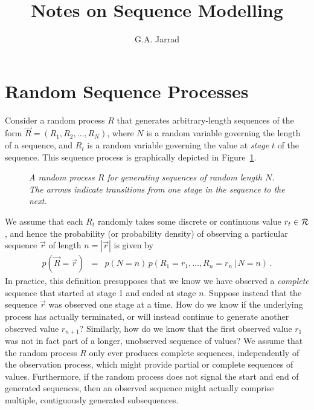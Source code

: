 \documentclass[a4paper]{article}
\title{Notes on Sequence Modelling}
\author{G.A. Jarrad}
\newcommand{\vr}{\vec{r}}
\begin{document}
\maketitle
{}
\section{Random Sequence Processes}
\label{sec:random-processes}
Consider a random process $R$ that generates arbitrary-length sequences
of the form $\vec{R}=(R_1,R_2,\ldots,R_N)$, where $N$ is a random variable governing
the length of a sequence, and $R_t$ is a random variable governing the value at {\em stage} $t$
of the sequence. This sequence process is graphically depicted in Figure~\ref{fig:R-process}.
\begin{figure}[hbt]
\centering
{}
\caption{\em A random process $R$ for generating sequences of random length $N$. The arrows indicate transitions from one stage in the sequence to the next.}
\label{fig:R-process}
\end{figure}

We assume that each $R_t$ randomly takes some discrete or continuous value $r_t\in{\cal R}$,
and hence the probability (or probability density) of observing a particular
sequence $\vr$ of length $n=|\vr|$ is given by
\begin{eqnarray}
   p(\vec{R}\!=\!\vr) & = & p(N=n)\,p(R_1\!=\!r_1,\ldots,R_n\!=\!r_n\,|\,N=n)\,.
\end{eqnarray}
In practice, this definition presupposes that we know we have observed a {\em complete} sequence that started
at stage 1 and ended at stage $n$.
Suppose instead that the sequence $\vr$ was observed one stage at a time. How do we know if the
underlying process has actually terminated, or will instead
continue to generate another observed value $r_{n+1}$? 
Similarly, how do we know that the first observed value $r_1$ was not in fact
part of a longer, unobserved sequence of values?
We assume that the random process $R$ only ever produces complete sequences,
independently of the observation process, which might provide partial or complete sequences of values.
Furthermore, if the random process does not signal the start and end of generated sequences,
then an observed sequence might actually comprise multiple, contiguously generated subsequences.
\end{document}
